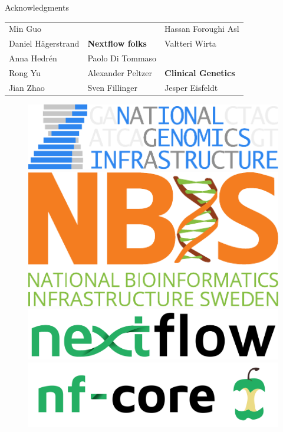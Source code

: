 \documentclass[usepdftitle=false]{beamer}
\begin{document}
\begin{frame}{Acknowledgments}
\begin{table}
{\begin{tabular}{lll}
		Min Guo											&															&	Hassan Foroughi Asl				\\
		Daniel Hägerstrand					&	\textbf{Nextflow folks}			&	Valtteri Wirta						\\
		Anna Hedrén									&	Paolo Di Tommaso						&														\\
		Rong Yu											&	Alexander Peltzer						&	\textbf{Clinical Genetics}\\
		Jian Zhao										&	Sven Fillinger							&	Jesper Eisfeldt						\\
		\end{tabular}}
	\end{table}
	\begin{figure}
		\includegraphics[height=.6cm]{pictures/NGI}%
		\hfill%
		\includegraphics[height=.6cm]{pictures/NBIS}%
		\hfill%
		\includegraphics[height=.6cm]{pictures/nextflow.png}%
		\hfill%
		\includegraphics[height=.6cm]{pictures/nf-core-logo}%
	\end{figure}
\end{frame}

\end{document}
